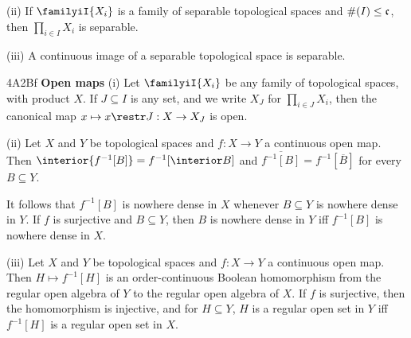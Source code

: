 \quad (ii) If $\familyiI{X_i}$ is a family of separable topological
spaces and $\#(I)\le\frak c$, then $\prod_{i\in I}X_i$ is separable.

\quad (iii) A continuous image of a separable topological space is
separable.   

\spheader 4A2Bf {\bf Open maps} (i) Let $\familyiI{X_i}$ be any family of
topological
spaces, with product $X$.   If $J\subseteq I$ is any set, and we write
$X_J$ for $\prod_{i\in J}X_i$, then the canonical map
$x\mapsto x\restr J:X\to X_J$ is open.

\quad(ii) Let $X$ and $Y$ be topological spaces and $f:X\to Y$ a
continuous open map.   Then
$\interior{f^{-1}[B]}=f^{-1}[\interior B]$ and
$\overline{f^{-1}[B]}=f^{-1}[\overline{B}]$ for every $B\subseteq Y$.

It follows that $f^{-1}[B]$ is nowhere dense in $X$ whenever $B\subseteq Y$
is nowhere dense in $Y$.   
If $f$ is surjective and $B\subseteq Y$, then
$B$ is nowhere dense in $Y$ iff $f^{-1}[B]$ is nowhere dense in $X$.

\quad(iii)
Let $X$ and $Y$ be topological spaces and $f:X\to Y$ a
continuous open map.   Then $H\mapsto f^{-1}[H]$ is an order-continuous
Boolean homomorphism from the regular open algebra of $Y$ to the regular
open algebra of $X$.      If $f$ is surjective, then
the homomorphism is injective, and for $H\subseteq Y$, $H$ is a regular
open set in $Y$ iff $f^{-1}[H]$ is a regular open set in $X$.

